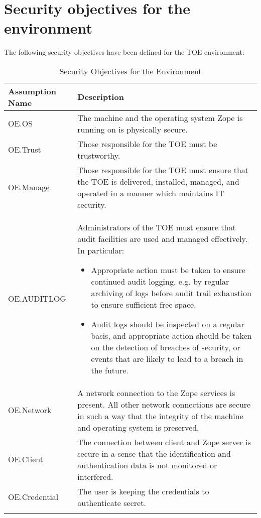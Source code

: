 \documentclass[12pt,english]{scrbook}
\begin{document}



\section{Security objectives for the environment}

The following security objectives have been defined for the TOE environment:

\begin{longtable}[c]{lp{10cm}}
  \toprule
  Assumption Name  &  Description \\
  \midrule\endhead

  OE.OS
   & 
  The machine and the operating system Zope is running
  on is physically secure.
   \\

  OE.Trust
   & 
  Those responsible for the TOE must be trustworthy.
   \\

  OE.Manage
   & 
  Those responsible for the TOE must ensure that the TOE
  is delivered, installed, managed, and operated in a
  manner which maintains IT security.
   \\

  OE.AUDITLOG
   & 
  Administrators of the TOE must ensure that audit
  facilities are used and managed effectively. In
  particular:

  \begin{itemize}
  
    \item Appropriate action must be taken to ensure continued audit logging,
    e.g. by regular archiving of logs before audit trail exhaustion to ensure
    sufficient free space.

    \item Audit logs should be inspected on a regular basis, and appropriate
    action should be taken on the detection of breaches of security, or events
    that are likely to lead to a breach in the future.

  \end{itemize}
   \\

  OE.Network
   & 
  A network connection to the Zope services is present.
  All other network connections are secure in such a
  way that the integrity of the machine and operating
  system is preserved.
   \\

  OE.Client
   & 
  The connection between client and Zope server is secure
  in a sense that the identification and authentication
  data is not monitored or interfered.
   \\

  OE.Credential
   & 
  The user is keeping the credentials to authenticate
  secret.
  \\
  \bottomrule
  \caption{Security Objectives for the Environment}
\end{longtable}
\end{document}
